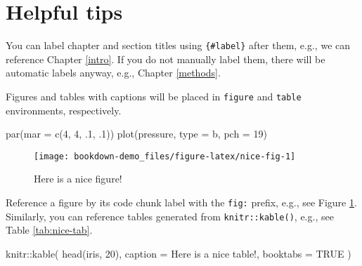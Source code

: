 \documentclass[
]{book}
\newenvironment{Shaded}{\begin{snugshade}}{\end{snugshade}}
\newcommand{\AttributeTok}[1]{\textcolor[rgb]{0.77,0.63,0.00}{#1}}
\newcommand{\ConstantTok}[1]{\textcolor[rgb]{0.00,0.00,0.00}{#1}}
\newcommand{\DecValTok}[1]{\textcolor[rgb]{0.00,0.00,0.81}{#1}}
\newcommand{\FunctionTok}[1]{\textcolor[rgb]{0.00,0.00,0.00}{#1}}
\newcommand{\NormalTok}[1]{#1}
\newcommand{\SpecialCharTok}[1]{\textcolor[rgb]{0.00,0.00,0.00}{#1}}
\newcommand{\StringTok}[1]{\textcolor[rgb]{0.31,0.60,0.02}{#1}}
\begin{document}
\hypertarget{helpful-tips}{%
\section{Helpful tips}\label{helpful-tips}}

You can label chapter and section titles using \texttt{\{\#label\}} after them, e.g., we can reference Chapter \ref{intro}. If you do not manually label them, there will be automatic labels anyway, e.g., Chapter \ref{methods}.

Figures and tables with captions will be placed in \texttt{figure} and \texttt{table} environments, respectively.

\begin{Shaded}
\begin{Highlighting}[]
\FunctionTok{par}\NormalTok{(}\AttributeTok{mar =} \FunctionTok{c}\NormalTok{(}\DecValTok{4}\NormalTok{, }\DecValTok{4}\NormalTok{, .}\DecValTok{1}\NormalTok{, .}\DecValTok{1}\NormalTok{))}
\FunctionTok{plot}\NormalTok{(pressure, }\AttributeTok{type =} \StringTok{\textquotesingle{}b\textquotesingle{}}\NormalTok{, }\AttributeTok{pch =} \DecValTok{19}\NormalTok{)}
\end{Highlighting}
\end{Shaded}

\begin{figure}

{\centering \texttt{[image: bookdown-demo\_files/figure-latex/nice-fig-1]} 

}

\caption{Here is a nice figure!}\label{fig:nice-fig}
\end{figure}

Reference a figure by its code chunk label with the \texttt{fig:} prefix, e.g., see Figure \ref{fig:nice-fig}. Similarly, you can reference tables generated from \texttt{knitr::kable()}, e.g., see Table \ref{tab:nice-tab}.

\begin{Shaded}
\begin{Highlighting}[]
\NormalTok{knitr}\SpecialCharTok{::}\FunctionTok{kable}\NormalTok{(}
  \FunctionTok{head}\NormalTok{(iris, }\DecValTok{20}\NormalTok{), }\AttributeTok{caption =} \StringTok{\textquotesingle{}Here is a nice table!\textquotesingle{}}\NormalTok{,}
  \AttributeTok{booktabs =} \ConstantTok{TRUE}
\NormalTok{)}
\end{Highlighting}
\end{Shaded}
\end{document}
